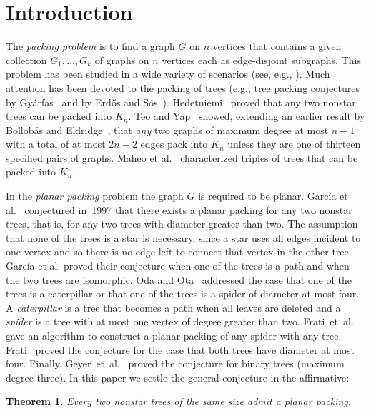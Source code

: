 \documentclass[11pt,a4paper,colorlinks=true,urlcolor=blue,citecolor=red]{article}
\theoremstyle{plain}
\newtheorem{theorem}{Theorem}
\begin{document}
\section{Introduction}\label{sec:introduction}
The \emph{packing problem} is to find a graph $G$ on $n$ vertices that
contains a given collection $G_1,\ldots, G_k$ of graphs on $n$ vertices
each as edge-disjoint subgraphs. This problem has been studied in a wide
variety of scenarios (see, e.g., \cite{AkiyamaC90,CaroY97,FrSz}). Much
attention has been devoted to the packing of trees (e.g., tree packing
conjectures by Gy\'arfas~\cite{gl-ptdok-78} and by Erd\H{o}s and
S\'os~\cite{e-epgt-65}). Hedetniemi~\cite{MR629868} proved that any two
nonstar trees can be packed into $K_n$. Teo and Yap~\cite{ty-ptgo-90}
showed, extending an earlier result by Bollob\'as and
Eldridge~\cite{be-pgacc-78}, that \emph{any} two graphs of maximum
degree at most $n-1$ with a total of at most $2n-2$ edges pack into
$K_n$ unless they are one of thirteen specified pairs of graphs. Maheo
et al{.}~\cite{msw-1996} characterized triples of trees that can be
packed into $K_n$.

In the \emph{planar packing} problem the graph $G$ is required to be
planar. Garc\'ia et al.~\cite{ghhnt-2002} conjectured in~1997 that there
exists a planar packing for any two nonstar trees, that is, for any two
trees with diameter greater than two. The assumption that none of the
trees is a star is necessary, since a star uses all edges incident to
one vertex and so there is no edge left to connect that vertex in the
other tree. Garc\'ia et al{.} proved their conjecture when one
of the trees is a path and when the two trees are isomorphic. Oda and
Ota~\cite{oo-2006} addressed the case that one of the trees is a
caterpillar or that one of the trees is a spider of diameter at most
four. A \emph{caterpillar} is a tree that becomes a path when all leaves
are deleted and a \emph{spider} is a tree with at most one vertex of
degree greater than two. Frati~et~al.~\cite{j-fgk-pptst-08} gave an
algorithm to construct a planar packing of any spider with any
tree. Frati~\cite{f-ppdft-09} proved the conjecture for the case that
both trees have diameter at most four. Finally,
Geyer~et~al.~\cite{gkh-ppbt-13} proved the conjecture for binary trees
(maximum degree three). In this paper we settle the general conjecture
in the affirmative:
\begin{theorem}\label{thm:planar_packing}
  Every two nonstar trees of the same size admit a planar packing.
\end{theorem}
\end{document}
